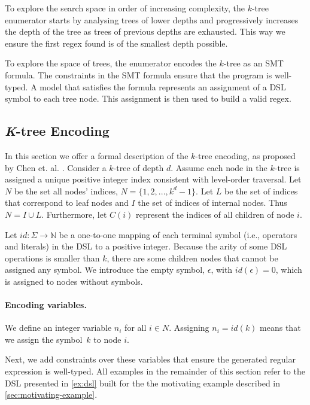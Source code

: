 To explore the search space in order of increasing complexity, the \(k\)-tree enumerator starts by analysing trees of lower depths and progressively increases the depth of the tree as trees of previous depths are exhausted.
This way we ensure the first regex found is of the smallest depth possible.





To explore the space of trees, the enumerator encodes the \(k\)-tree as an \ac{SMT} formula. 
%
The constraints in the \ac{SMT} formula ensure that the program is well-typed. 
%
A model that satisfies the formula represents an assignment of a DSL symbol to each tree node. This assignment is then used to build a valid regex.

\subsection{\textit{K}-tree Encoding}\label{sec:k-tree}

In this section we offer a formal description of the \(k\)-tree encoding, as proposed by Chen et. al. \cite{DBLP:conf/sigsoft/ChenMF19,Orvalho19}.
Consider a \(k\)-tree of depth \(d\). Assume each node in the \(k\)-tree is assigned a unique positive integer index consistent with level-order traversal. Let \(N\) be the set all nodes' indices, \(N = \{1, 2, ..., k^d - 1\}\).
%
Let \(L\) be the set of indices that correspond to leaf nodes and \(I\) the set of indices of internal nodes. Thus \(N = I \cup L\). Furthermore, let \(C(i)\) represent the indices of all children of node \(i\).

Let \(id: \Sigma \to \mathbb{N}\) be a one-to-one mapping of each terminal symbol (i.e., operators and literals) in the DSL to a positive integer.
Because the arity of some DSL operations is smaller than \(k\), there are some children nodes that cannot be assigned any symbol. We introduce the empty symbol, \(\epsilon\), with \(id(\epsilon) = 0\), which is assigned to nodes without symbols.

\paragraph{Encoding variables.}
We define an integer variable \(n_i\) for all \(i \in N\). Assigning \(n_i = id(k)\) means
that we assign the symbol~\(k\) to node \(i\).

\medskip

Next, we add constraints over these variables that ensure the generated regular expression is well-typed. 
All examples in the remainder of this section refer to the DSL presented in \autoref{ex:dsl} built for the
the motivating example described in \autoref{sec:motivating-example}.

